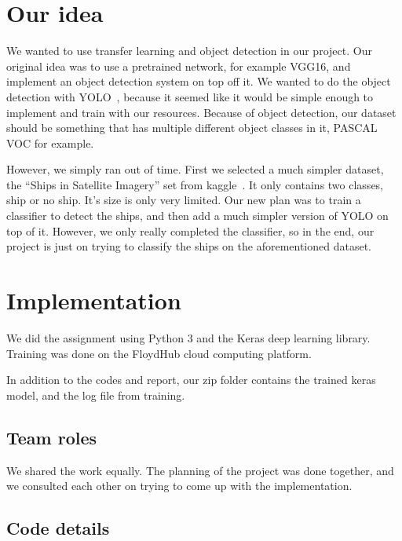 
\section{Our idea}

We wanted to use transfer learning and object detection in our project. Our
original idea was to use a pretrained network, for example VGG16, and implement
an object detection system on top off it. We wanted to do the object detection
with YOLO~\cite{DBLP:journals/corr/RedmonDGF15}, because it seemed like it
would be simple enough to implement and train with our resources. Because of
object detection, our dataset should be something that has multiple different
object classes in it, PASCAL VOC for example.

However, we simply ran out of time. First we selected a much simpler dataset,
the ``Ships in Satellite Imagery'' set from kaggle~\cite{ships}. It only
contains two classes, ship or no ship. It's size is only very limited. Our new
plan was to train a classifier to detect the ships, and then add a much simpler
version of YOLO on top of it. However, we only really completed the classifier,
so in the end, our project is just on trying to classify the ships on the
aforementioned dataset.


\section{Implementation}

We did the assignment using Python 3 and the Keras deep learning library.
Training was done on the FloydHub cloud computing platform.

In addition to the codes and report, our zip folder contains the trained keras
model, and the log file from training.

\subsection{Team roles}
We shared the work equally. The planning of the project was done together, and
we consulted each other on trying to come up with the implementation.

\subsection{Code details}


